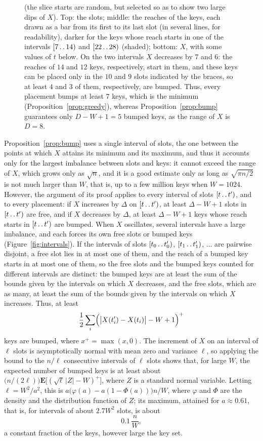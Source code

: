 \documentclass[11pt]{article}
\def\..{\,\mathpunct{\ldotp\ldotp}} %
\begin{document}
\begin{figure}[t]
{(the slice starts are random, but selected so as to show two large dips of
$X$). Top: the slots; middle: the reaches of the keys, each drawn as a bar from
its first to its last slot (in several lines, for readability), darker for
the keys whose reach starts in one of the intervals $[7\..14)$ and
$[22\..28)$ (shaded); bottom: $X$, with some values of $t$ below. On the two
intervals $X$ decreases by $7$ and $6$: the reaches of $14$ and $12$ keys,
respectively, start in them, and these keys can be placed only in the $10$
and $9$ slots indicated by the braces, so at least $4$ and $3$ of them,
respectively, are bumped. Thus, every placement bumps at least $7$ keys,
which is the minimum (Proposition~\ref{prop:greedy}), whereas
Proposition~\ref{prop:bump} guarantees only $D-W+1=5$ bumped keys, as the
range of $X$ is $D=8$.}
\end{figure}

Proposition~\ref{prop:bump} uses a single interval of slots, the one between
the points at which $X$ attains its minimum and its maximum, and thus it
accounts only for the largest imbalance between slots and keys: it cannot
exceed the range of $X$, which grows only as $\sqrt n$, and it is a good
estimate only as long as $\sqrt{\pi n/2}$ is not much larger than $W$, that
is, up to a few million keys when $W=1024$. However, the argument of its
proof applies to every interval of slots $[t\..t')$, and to every placement:
if $X$ increases by $\Delta$ on $[t\..t')$, at least $\Delta-W+1$ slots in
$[t\..t')$ are free, and if $X$ decreases by $\Delta$, at least
$\Delta-W+1$ keys whose reach starts in $[t\..t')$ are bumped. When $X$
oscillates, several intervals have a large imbalance, and each forces its own
free slots or bumped keys (Figure~\ref{fig:intervals}). If the intervals of
slots $[t_0\..t'_0)$, $[t_1\..t'_1)$, $\ldots$ are pairwise disjoint, a free
slot lies in at most one of them, and the reach of a bumped key starts in at
most one of them, so the free slots and the bumped keys counted for
different intervals are distinct: the bumped keys are at least the sum of
the bounds given by the intervals on which $X$ decreases, and the free slots,
which are as many, at least the sum of the bounds given by the intervals on
which $X$ increases. Thus, at least
\[
\frac12\sum_i\Bigl(\bigl|X(t'_i)-X(t_i)\bigr|-W+1\Bigr)^+
\]
keys are bumped, where $x^+=\max(x,0)$. The increment of $X$ on an interval
of $\ell$ slots is asymptotically normal with mean zero and variance $\ell$,
so applying the bound to the $n/\ell$ consecutive intervals of $\ell$ slots
shows that, for large $W$, the expected number of bumped keys is at least
about $\bigl(n/(2\ell)\bigr)\mathbf E\bigl[(\sqrt\ell\,|Z|-W)^+\bigr]$, where $Z$
is a standard normal variable. Letting $\ell=W^2/a^2$, this is
$a\bigl(\varphi(a)-a(1-\Phi(a))\bigr)n/W$, where $\varphi$ and $\Phi$ are
the density and the distribution function of $Z$; its maximum, attained for
$a\approx0.61$, that is, for intervals of about $2.7W^2$ slots, is about
\[
0.1\,\frac nW,
\]
a constant fraction of the keys, however large the key set.
\end{document}
